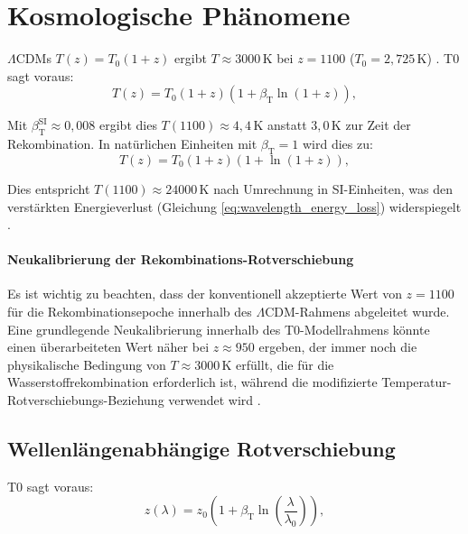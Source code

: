 \documentclass[12pt,a4paper]{article}
\newcommand{\betaT}{\beta_{\text{T}}}
\newcommand{\LCDM}{\Lambda\text{CDM}}
\begin{document}
	\section{Kosmologische Phänomene}
	\(\LCDM\)s \(T(z) = T_0 (1 + z)\) ergibt \(T \approx 3000 \, \text{K}\) bei \(z = 1100\) (\(T_0 = 2,725 \, \text{K}\)) \cite{Fixsen2009}. T0 sagt voraus:
	\begin{equation}
		T(z) = T_0 (1 + z) (1 + \betaT \ln(1 + z)),
		\label{eq:temperature_redshift}
	\end{equation}
	
	Mit \(\betaT^{\text{SI}} \approx 0,008\) ergibt dies \(T(1100) \approx 4,4 \, \text{K}\) anstatt \(3,0 \, \text{K}\) zur Zeit der Rekombination. In natürlichen Einheiten mit \(\betaT = 1\) wird dies zu:
	\begin{equation}
		T(z) = T_0 (1 + z) (1 + \ln(1 + z)),
		\label{eq:temperature_redshift_natural}
	\end{equation}
	
	Dies entspricht \(T(1100) \approx 24000 \, \text{K}\) nach Umrechnung in SI-Einheiten, was den verstärkten Energieverlust (Gleichung \ref{eq:wavelength_energy_loss}) widerspiegelt \cite{pascher_temp_2025}.
	
	\paragraph{Neukalibrierung der Rekombinations-Rotverschiebung} Es ist wichtig zu beachten, dass der konventionell akzeptierte Wert von \(z = 1100\) für die Rekombinationsepoche innerhalb des \(\LCDM\)-Rahmens abgeleitet wurde. Eine grundlegende Neukalibrierung innerhalb des T0-Modellrahmens könnte einen überarbeiteten Wert näher bei \(z \approx 950\) ergeben, der immer noch die physikalische Bedingung von \(T \approx 3000 \, \text{K}\) erfüllt, die für die Wasserstoffrekombination erforderlich ist, während die modifizierte Temperatur-Rotverschiebungs-Beziehung verwendet wird \cite{pascher_temp_2025}.
	
	\subsection{Wellenlängenabhängige Rotverschiebung}
	\label{subsec:wavelength_redshift}
	
	T0 sagt voraus:
	\begin{equation}
		z(\lambda) = z_0 \left(1 + \betaT \ln\left(\frac{\lambda}{\lambda_0}\right)\right),
		\label{eq:wavelength_redshift}
	\end{equation}
	
\end{document}
